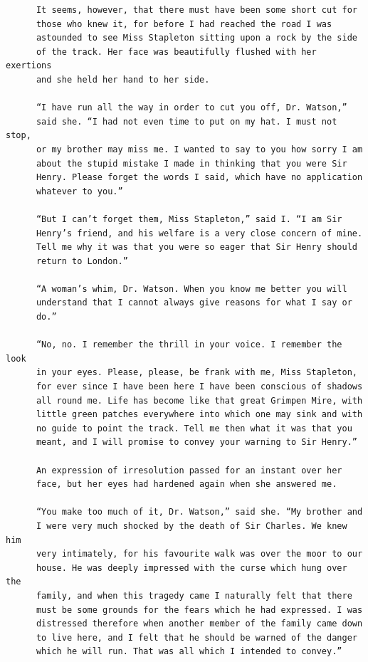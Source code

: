 \documentclass{article}
\begin{document}
\begin{verbatim}
      It seems, however, that there must have been some short cut for
      those who knew it, for before I had reached the road I was
      astounded to see Miss Stapleton sitting upon a rock by the side
      of the track. Her face was beautifully flushed with her exertions
      and she held her hand to her side.

      “I have run all the way in order to cut you off, Dr. Watson,”
      said she. “I had not even time to put on my hat. I must not stop,
      or my brother may miss me. I wanted to say to you how sorry I am
      about the stupid mistake I made in thinking that you were Sir
      Henry. Please forget the words I said, which have no application
      whatever to you.”

      “But I can’t forget them, Miss Stapleton,” said I. “I am Sir
      Henry’s friend, and his welfare is a very close concern of mine.
      Tell me why it was that you were so eager that Sir Henry should
      return to London.”

      “A woman’s whim, Dr. Watson. When you know me better you will
      understand that I cannot always give reasons for what I say or
      do.”

      “No, no. I remember the thrill in your voice. I remember the look
      in your eyes. Please, please, be frank with me, Miss Stapleton,
      for ever since I have been here I have been conscious of shadows
      all round me. Life has become like that great Grimpen Mire, with
      little green patches everywhere into which one may sink and with
      no guide to point the track. Tell me then what it was that you
      meant, and I will promise to convey your warning to Sir Henry.”

      An expression of irresolution passed for an instant over her
      face, but her eyes had hardened again when she answered me.

      “You make too much of it, Dr. Watson,” said she. “My brother and
      I were very much shocked by the death of Sir Charles. We knew him
      very intimately, for his favourite walk was over the moor to our
      house. He was deeply impressed with the curse which hung over the
      family, and when this tragedy came I naturally felt that there
      must be some grounds for the fears which he had expressed. I was
      distressed therefore when another member of the family came down
      to live here, and I felt that he should be warned of the danger
      which he will run. That was all which I intended to convey.”


\end{verbatim}
\end{document}
